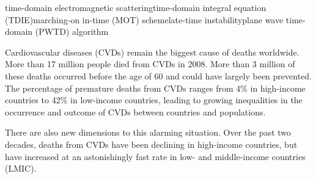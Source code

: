 
\begin{Eabstract}{time-domain electromagnetic scattering}{time-domain integral equation
(TDIE)}{marching-on in-time (MOT) scheme}{late-time instability}{plane
wave time-domain (PWTD) algorithm}

Cardiovascular diseases (CVDs) remain the biggest cause of deaths worldwide.
More than 17 million people died from CVDs in 2008.
More than 3 million of these deaths occurred before the
age of 60 and could have largely been prevented.
The percentage of premature deaths from CVDs ranges from 4\% in high-income
countries to 42\% in low-income countries, leading to growing
inequalities in the occurrence and outcome of CVDs between
countries and populations.

There are also new dimensions to this alarming situation. Over
the past two decades, deaths from CVDs have been declining in
high-income countries, but have increased at an astonishingly
fast rate in low- and middle-income countries (LMIC).
\end{Eabstract}

